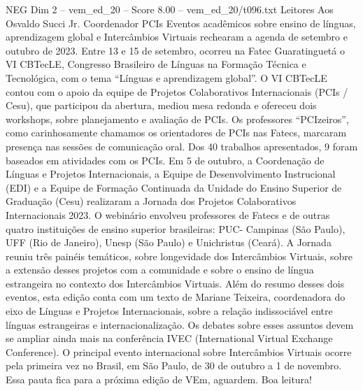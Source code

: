 \begin{textsample}{NEG Dim 2 – vem\_ed\_20 – Score 8.00 – vem\_ed\_20/t096.txt}  \label{ex:f2_neg_092}
Leitores Aos Osvaldo Succi Jr.
Coordenador PCIs Eventos acadêmicos sobre ensino de línguas, aprendizagem global e Intercâmbios Virtuais rechearam a agenda de setembro e outubro de 2023.
Entre 13 e 15 de setembro, ocorreu na Fatec Guaratinguetá o VI CBTecLE, Congresso Brasileiro de Línguas na Formação Técnica e Tecnológica, com o tema “Línguas e aprendizagem global”.
O VI CBTecLE contou com o apoio da equipe de Projetos Colaborativos Internacionais (PCIs / Cesu), que participou da abertura, mediou mesa redonda e ofereceu dois workshops, sobre planejamento e avaliação de PCIs.
Os professores “PCIzeiros”, como carinhosamente chamamos os orientadores de PCIs nas Fatecs, marcaram presença nas sessões de comunicação oral.
Dos 40 trabalhos apresentados, 9 foram baseados em atividades com os PCIs.
Em 5 de outubro, a Coordenação de Línguas e Projetos Internacionais, a Equipe de Desenvolvimento Instrucional (EDI) e a Equipe de Formação Continuada da Unidade do Ensino Superior de Graduação (Cesu) realizaram a Jornada dos Projetos Colaborativos Internacionais 2023.
O webinário envolveu professores de Fatecs e de outras quatro instituições de ensino superior brasileiras: PUC- Campinas (São Paulo), UFF (Rio de Janeiro), Unesp (São Paulo) e Unichristus (Ceará).
A Jornada reuniu três painéis temáticos, sobre longevidade dos Intercâmbios Virtuais, sobre a extensão desses projetos com a comunidade e sobre o ensino de língua estrangeira no contexto dos Intercâmbios Virtuais.
Além do resumo desses dois eventos, esta edição conta com um texto de Mariane Teixeira, coordenadora do eixo de Línguas e Projetos Internacionais, sobre a relação indissociável entre línguas estrangeiras e internacionalização.
Os debates sobre esses assuntos devem se ampliar ainda mais na conferência IVEC (International Virtual Exchange Conference).
O principal evento internacional sobre Intercâmbios Virtuais ocorre pela primeira vez no Brasil, em São Paulo, de 30 de outubro a 1 de novembro.
Essa pauta fica para a próxima edição de VEm, aguardem.
Boa leitura!

\end{textsample}
